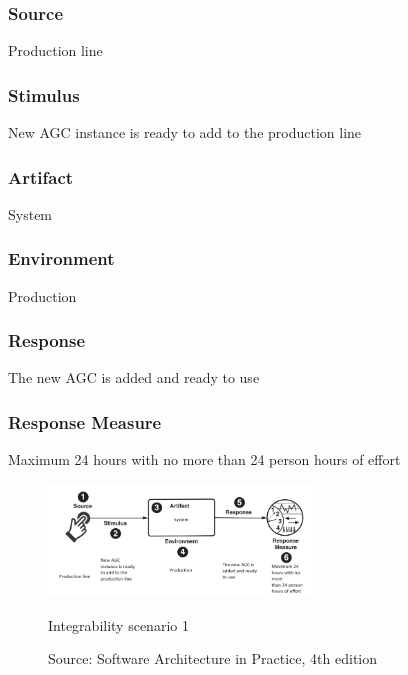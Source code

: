 \subsubsection{Source}
Production line

\subsubsection{Stimulus}
New AGC instance is ready to add to the production line

\subsubsection{Artifact}
System

\subsubsection{Environment}
Production

\subsubsection{Response}
The new AGC is added and ready to use

\subsubsection{Response Measure}
Maximum 24 hours with no more than 24 person hours of effort
\begin{figure}[ht]
\centering
  \includegraphics[height=3cm]{images/qa_scenario_deploy_new_agc.png}
  \caption{Integrability scenario 1}
  \caption*{Source: Software Architecture in Practice, 4th edition \cite{bass2021software}}
  \label{fig:qa_integrability_scenario_1}
\end{figure}


